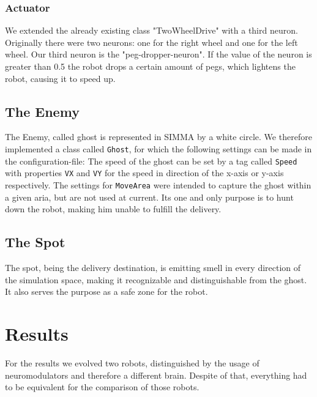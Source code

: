 \documentclass[12pt,fleqn,a4paper]{article}
\begin{document}
\subsubsection{Actuator}
We extended the already existing class "TwoWheelDrive" with a third neuron. Originally there were two neurons: one for the right wheel and one for the left wheel. Our third neuron is the "peg-dropper-neuron". If the value of the neuron is greater than 0.5 the robot drops a certain amount of pegs, which lightens the robot, causing it to speed up.

\subsection{The Enemy}

The Enemy, called ghost is represented in SIMMA by a white circle. We therefore implemented a class called \texttt{Ghost}, for which the following settings can be made in the configuration-file: The speed of the ghost can be set by a tag called \texttt{Speed} with properties \texttt{VX} and \texttt{VY} for the speed in direction of the x-axis or y-axis respectively. The settings for \texttt{MoveArea} were intended to capture the ghost within a given aria, but are not used at current. Its one and only purpose is to hunt down the robot, making him unable to fulfill the delivery.

\subsection{The Spot}
The spot, being the delivery destination, is emitting smell in every direction of the simulation space, making it recognizable and distinguishable from the ghost. It also serves the purpose as a safe zone for the robot.

\section{Results}
For the results we evolved two robots, distinguished by the usage of neuromodulators and therefore a different brain. Despite of that, everything had to be equivalent for the comparison of those robots.
\newpage
\end{document}
